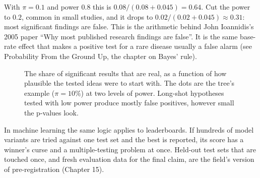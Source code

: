 With $\pi=0.1$ and power $0.8$ this is $0.08/(0.08+0.045)=0.64$. Cut the power to
$0.2$, common in small studies, and it drops to $0.02/(0.02+0.045)\approx 0.31$:
most significant findings are false. This is the arithmetic behind John Ioannidis's
2005 paper ``Why most published research findings are false''. It is the same
base-rate effect that makes a positive test for a rare disease usually a false
alarm (see Probability From the Ground Up, the chapter on Bayes' rule).

\begin{figure}[H]
\centering
{}
\caption{The share of significant results that are real, as a function of how
plausible the tested ideas were to start with. The dots are the tree's example
($\pi=10\%$) at two levels of power. Long-shot hypotheses tested with low
power produce mostly false positives, however small the p-values look.}
\label{fig:pitfalls-ppv}
\end{figure}

\begin{connectionbox}
In machine learning the same logic applies to leaderboards. If hundreds of model
variants are tried against one test set and the best is reported, its score has a
winner's curse and a multiple-testing problem at once. Held-out test sets that are
touched once, and fresh evaluation data for the final claim, are the field's
version of pre-registration (Chapter 15).
\end{connectionbox}

